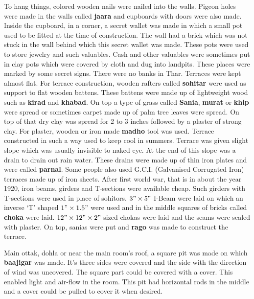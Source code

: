 To hang things, colored wooden nails were nailed into the walls. Pigeon holes
were made in the walls called \textbf{jaara} and cupboards with doors were also
made. Inside the cupboard, in a corner, a secret wallet was made in which a
small pot used to be fitted at the time of construction. The wall had a brick
which was not stuck in the wall behind which this secret wallet was made. These
pots were used to store jewelry and such valuables. Cash and other valuables
were sometimes put in clay pots which were covered by cloth and dug into
landpits. These places were marked by some secret signs. There were no banks in
Thar. 
Terraces were kept almost flat. For terrace construction, wooden rafters called
\textbf{sohitar} were used as support to flat wooden battens. These battens were
made up of lightweight wood such as \textbf{kirad} and \textbf{khabad}. On top a
type of grass called \textbf{Sania}, \textbf{murat} or \textbf{khip} were spread
or sometimes carpet made up of palm tree leaves were spread. On top of that dry
clay was spread for 2 to 3 inches followed by a plaster of strong clay. For
plaster, wooden or iron made \textbf{madho} tool was used. Terrace constructed
in such a way used to keep cool in summers. Terrace was given slight slope which
was usually invisible to naked eye. At the end of this slope was a drain to
drain out rain water. These drains were made up of thin iron plates and were
called \textbf{parnal}. Some people also used G.C.I. (Galvanised Corrugated Iron) terraces made up of iron
sheets.
After first world war, that is in about the year 1920, iron beams, girders and
T-sections were available cheap. Such girders with T-sections were used in place
of sohitors. $3" \times 5"$ I-Beam were laid on which an inverse `T' shaped $1"
\times 1.5"$ were used and in the middle squares of bricks called \textbf{choka}
were laid. $12" \times 12" \times 2"$ sized chokas were laid and the seams were
sealed with plaster. On top, sanias were put and \textbf{rago} was made to
construct the terrace.

Main ottak, dohla or near the main room's roof, a square pit was made on which
\textbf{baajigar} was made. It's three sides were covered and the side with the
direction of wind was uncovered. The square part could be covered with a cover.
This enabled light and air-flow in the room. This pit had horizontal rods in the
middle and a cover could be pulled to cover it when desired.

